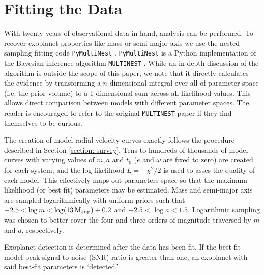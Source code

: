 \documentclass[12pt,manuscript]{aastex}
\begin{document}
\section{Fitting the Data}
\label{section: fitting}

With twenty years of observational data in hand, analysis can be performed. 
To recover exoplanet properties like mass or semi-major axis we use the nested sampling fitting code \texttt{PyMultiNest} \citep{buchner14}.
\texttt{PyMultiNest} is a Python implementation of the Bayesian inference algorithm \texttt{MULTINEST} \citep{feroz09}.
While an in-depth discussion of the algorithm is outside the scope of this paper, we note that it directly calculates the evidence by transforming a $n$-dimensional integral over all of parameter space (i.e. the prior volume) to a 1-dimensional sum across all likelihood values. 
This allows direct comparison between models with different parameter spaces.
The reader is encouraged to refer to the original \texttt{MULTINEST} paper if they find themselves to be curious.

The creation of model radial velocity curves exactly follows the procedure described in Section \ref{section: survey}.
Tens to hundreds of thousands of model curves with varying values of $m, a$ and $t_0$ ($e$ and $\omega$ are fixed to zero) are created for each system, and the log likelihood $L=-\chi^2/2$ is used to asses the quality of each model.
This effectively maps out parameters space so that the maximum likelihood (or best fit) parameters may be estimated.
Mass and semi-major axis are sampled logarithmically with uniform priors such that $-2.5 < \log m < \log (\SI{13}{M_{Jup}}) + 0.2$ and $-2.5 < \log a < 1.5$. 
Logarithmic sampling was chosen to better cover the four and three orders of magnitude traversed by $m$ and $a$, respectively.

Exoplanet detection is determined after the data has been fit. 
If the best-fit model peak signal-to-noise (SNR) ratio is greater than one, an exoplanet with said best-fit parameters is `detected.'

% 
\end{document}
